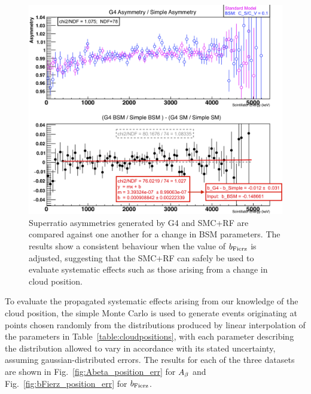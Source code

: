 \begin{figure}[h!!!t]
	\centering
	\includegraphics[width=.999\linewidth]
	{Figures/LineshapeDemo_quasiprelim.png}
\caption[Response Function Comparison]{Superratio asymmetries generated by G4 and SMC+RF are compared against one another for a change in BSM parameters.  The results show a consistent behaviour when the value of $b_{\mathrm{Fierz}}$ is adjusted, suggesting that the SMC+RF can safely be used to evaluate systematic effects such as those arising from a change in cloud position.
}    	
	\label{fig:lineshape_demo}
\end{figure}

To evaluate the propagated systematic effects arising from our knowledge of the cloud position, the simple Monte Carlo is used to generate events originating at points chosen randomly from the distributions produced by linear interpolation of the parameters in Table~\ref{table:cloudpositions}, with each parameter describing the distribution allowed to vary in accordance with its stated uncertainty, assuming gaussian-distributed errors.  The results for each of the three datasets are shown in Fig.~\ref{fig:Abeta_position_err} for $A_{\beta}$ and Fig.~\ref{fig:bFierz_position_err} for $b_{\mathrm{Fierz}}$.


